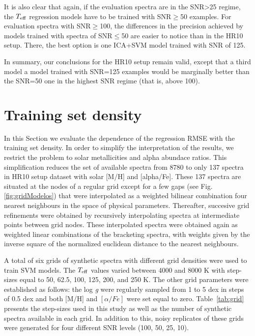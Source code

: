 \documentclass[a4paper,fleqn,usenatbib]{mnras}
\begin{document}
{It is also clear that again, if the evaluation spectra 
are in the SNR>25 regime, the $T_{\rm eff}$ 
regression models have to be trained with SNR$\ge$50 examples.
For evaluation spectra with SNR$\ge$100, the differences 
in the precision achieved by models trained with spectra of 
SNR$\le$50 are easier to notice than in the HR10 setup. There, the best 
option is one ICA+SVM model trained with SNR of 125.

In summary, our conclusions for the HR10 setup remain valid, except 
that a third model a model trained with SNR=125 examples would be marginally 
better than the SNR=50 one in the highest SNR regime (that is, above 100). 

\section{Training set density}
\label{sec:comparison3}

In this Section we evaluate the dependence of the regression 
RMSE with the training set density. In order to simplify the 
interpretation of the results, we restrict the problem to solar 
metallicities and alpha abundace ratios. This simplification 
reduces the set of available spectra from 8780 to only 137 
spectra in HR10 setup dataset with solar [M/H] and [alpha/Fe]. 
These 137 spectra are situated at the nodes of a regular 
grid except for a few gaps (see Fig. \ref{fig:gridModelos}) 
that were interpolated as a weighted bilinear combination four 
nearest neighbours in the space of physical parameters. Thereafter, 
succesive grid refinements were obtained by recursively interpolating 
spectra at intermediate points between grid nodes. These interpolated 
spectra were obtained again as weighted linear combinations of the 
bracketing spectra, with weights given by the inverse square of 
the normalized euclidean distance to the nearest neighbours.

A total of six grids of synthetic spectra with different grid densities were used to
train SVM models. The $T_{\rm eff}$ values varied between 4000 and
8000 K with step-sizes equal to 50, 62.5, 100, 125, 200, and 250 K. The other
grid parameters were established as follows: the log \textit{g} were
regularly sampled from 1 to 5 dex in steps of 0.5 dex and both [M/H] and $\left[
\alpha/Fe \right]$ were set equal to zero. Table~\ref{tab:grid} presents 
the step-sizes used in this study as well as the number of synthetic spectra available in each
grid.  In addition to this, noisy replicates of these grids were
generated for four different SNR levels (100, 50, 25, 10).


}
\end{document}
